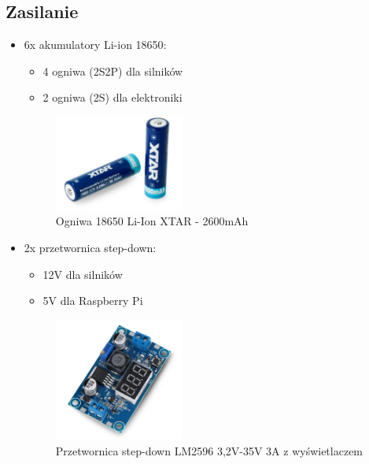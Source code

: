 \documentclass[a4paper,twoside,12pt]{book}
\begin{document}
\subsection{Zasilanie}
\begin{itemize}
\item 6x akumulatory Li-ion 18650:
	\begin{itemize}
	\item 4 ogniwa (2S2P) dla silników
	\item 2 ogniwa (2S) dla elektroniki
	\end{itemize}
	\begin{figure}
		\centering
		\includegraphics[width=0.4\textwidth]{images/ogniwo.png}
		\caption{Ogniwa 18650 Li-Ion XTAR - 2600mAh}
		\label{fig:ogniwa}
		\end{figure}
\item 2x przetwornica step-down:
	\begin{itemize}
	\item 12V dla silników
	\item 5V dla Raspberry Pi
	\end{itemize}
	\begin{figure}
		\centering
		\includegraphics[width=0.4\textwidth]{images/przetwo.png}
		\caption{Przetwornica step-down LM2596 3,2V-35V 3A z wyświetlaczem}
		\label{fig:przetwo}
		\end{figure}
\end{itemize}
\newpage
\end{document}
